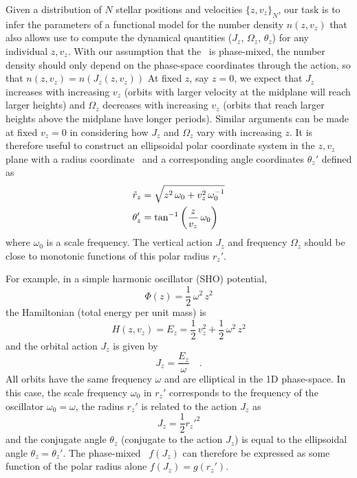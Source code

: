 Given a distribution of $N$ stellar positions and velocities $\{z, v_z\}_N$, our task is
to infer the parameters of a functional model for the number density $n(z, v_z)$ that
also allows use to compute the dynamical quantities ($J_z$, $\Omega_z$, $\theta_z$) for
any individual $z, v_z$.
With our assumption that the \df\ is phase-mixed, the number density should only depend
on the phase-space coordinates through the action, so that $n(z, v_z) = n(J_z(z, v_z))$
At fixed $z$, say $z=0$, we expect that $J_z$ increases with increasing $v_z$ (orbits
with larger velocity at the midplane will reach larger heights) and $\Omega_z$
decreases with increasing $v_z$ (orbits that reach larger heights above the midplane
have longer periods).
Similar arguments can be made at fixed $v_z=0$ in considering how $J_z$ and $\Omega_z$
vary with increasing $z$.
It is therefore useful to construct an ellipsoidal polar coordinate system in the $z,
v_z$ plane with a radius coordinate \rzp\ and a corresponding angle coordinates
$\theta_z'$ defined as
\begin{align}
    \tilde{r}_z &= \sqrt{z^2 \, \omega_0 + v_z^2 \, \omega_0^{-1}} \label{eq:rzp} \\
    \theta_z' &= \tan^{-1}\left(\frac{z}{v_z}\,\omega_0\right) \label{eq:thetazp}
\end{align}
where $\omega_0$ is a scale frequency.
The vertical action $J_z$ and frequency $\Omega_z$ should be close to monotonic
functions of this polar radius $r_z'$.

For example, in a simple harmonic oscillator (SHO) potential,
\begin{equation}
    \Phi(z) = \frac{1}{2} \, \omega^2 \, z^2
\end{equation}
the Hamiltonian (total energy per unit mass) is
\begin{equation}
    H(z, v_z) = E_z = \frac{1}{2} \, v_z^2 + \frac{1}{2} \, \omega^2 \,z^2
\end{equation}
and the orbital action $J_z$ is given by
\begin{equation}
    J_z = \frac{E_z}{\omega} \quad .
\end{equation}
All orbits have the same frequency $\omega$ and are elliptical in the 1D phase-space.
In this case, the scale frequency $\omega_0$ in $r_z'$ corresponds to the frequency of
the oscillator $\omega_0=\omega$, the radius $r_z'$ is related to the action $J_z$ as
\begin{equation}
    J_z = \frac{1}{2} r_z'^2
\end{equation}
and the conjugate angle $\theta_z$ (conjugate to the action $J_z$) is equal to the
ellipsoidal angle $\theta_z = \theta_z'$.
The phase-mixed \df\ $f(J_z)$ can therefore be expressed as some
function of the polar radius alone $f(J_z)=g(r_z')$.

